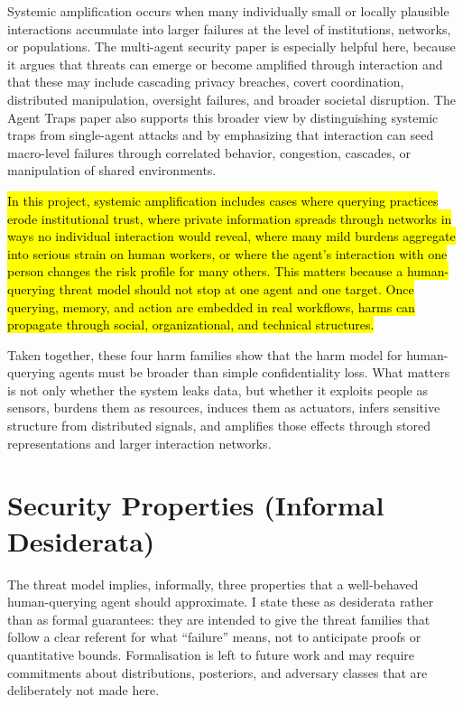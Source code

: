 \documentclass[11pt]{article}
\begin{document}
Systemic amplification occurs when many individually small or locally plausible interactions accumulate into larger failures at the level of institutions, networks, or populations. The multi-agent security paper is especially helpful here, because it argues that threats can emerge or become amplified through interaction and that these may include cascading privacy breaches, covert coordination, distributed manipulation, oversight failures, and broader societal disruption. \citep{schroeder2025multiagentsecurity,hammond2025multiagentrisks} The Agent Traps paper also supports this broader view by distinguishing systemic traps from single-agent attacks and by emphasizing that interaction can seed macro-level failures through correlated behavior, congestion, cascades, or manipulation of shared environments. \citep{franklin2026agenttraps}

\hl{In this project, systemic amplification includes cases where querying practices erode institutional trust, where private information spreads through networks in ways no individual interaction would reveal, where many mild burdens aggregate into serious strain on human workers, or where the agent's interaction with one person changes the risk profile for many others. This matters because a human-querying threat model should not stop at one agent and one target. Once querying, memory, and action are embedded in real workflows, harms can propagate through social, organizational, and technical structures.}

Taken together, these four harm families show that the harm model for human-querying agents must be broader than simple confidentiality loss. What matters is not only whether the system leaks data, but whether it exploits people as sensors, burdens them as resources, induces them as actuators, infers sensitive structure from distributed signals, and amplifies those effects through stored representations and larger interaction networks. \citep{oliver2026humanapi,brown2022privacylm,franklin2026agenttraps,schroeder2025multiagentsecurity}

\section{Security Properties (Informal Desiderata)}\label{sec:securityprops}

The threat model implies, informally, three properties that a well-behaved human-querying agent should approximate. I state these as desiderata rather than as formal guarantees: they are intended to give the threat families that follow a clear referent for what ``failure'' means, not to anticipate proofs or quantitative bounds. Formalisation is left to future work and may require commitments about distributions, posteriors, and adversary classes that are deliberately not made here.
\end{document}
